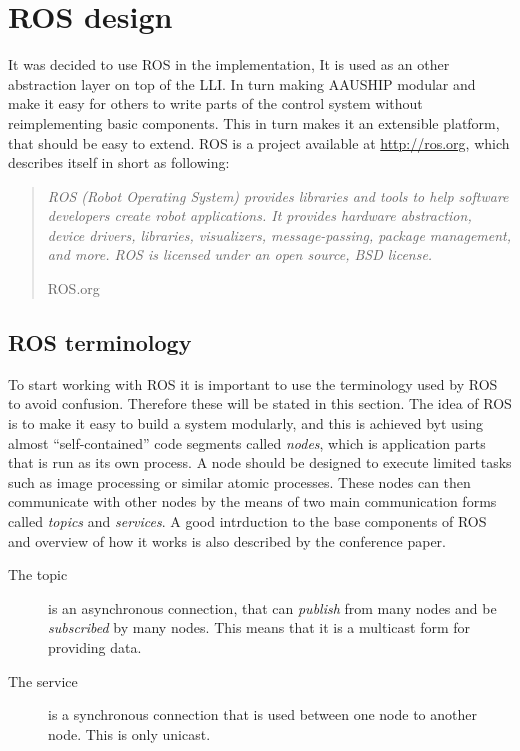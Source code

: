 \chapter{\acs{ROS} design}

It was decided to use \ac{ROS} in the implementation, It is used as an
other abstraction layer on top of the \ac{LLI}. In turn making AAUSHIP
modular and make it easy for others to write parts of the control
system without reimplementing basic components. This in turn makes it
an extensible platform, that should be easy to extend. \ac{ROS} is a
project available at \url{http://ros.org}, which describes itself in
short as following:

\begin{quote}
\textit{\noindent
	ROS (Robot Operating System) provides libraries and
	tools to help software developers create robot applications. It
	provides hardware abstraction, device drivers, libraries,
	visualizers, message-passing, package management, and more. ROS is
	licensed under an open source, BSD license.
}
		
	\hfill ROS.org
\end{quote}

\section{\acs{ROS} terminology}
To start working with \ac{ROS} it is important to use the terminology
used by \ac{ROS} to avoid confusion. Therefore these  will be stated
in this section.  The idea of \ac{ROS} is to make it easy to build a
system modularly, and this is achieved byt using almost
``self-contained'' code segments called \textit{nodes}, which is
application parts that is run as its own process. A node should be
designed to execute limited tasks such as image processing or similar
atomic processes. These nodes can then communicate with other nodes by
the means of two main communication forms called \textit{topics} and
\textit{services}. A good intrduction to the base components of \ac{ROS}
and overview of how it works is also described by the
\citep{rosoverview} conference paper.

\begin{description}
\item[The topic] is an asynchronous connection, that can \textit{publish}
from many nodes and be \textit{subscribed} by many nodes. This means
that it is a multicast form for providing data.
\item[The service] is a synchronous connection that is used between one node
to another node. This is only unicast.
\end{description}

